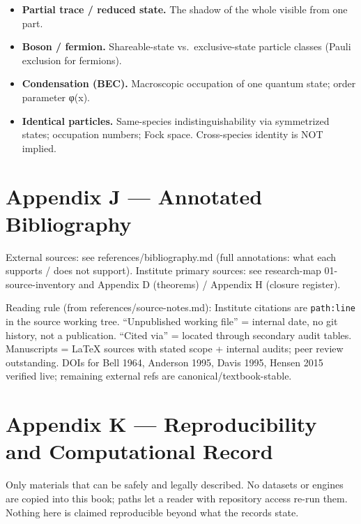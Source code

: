 \documentclass[
  11pt,
]{book}
\begin{document}
\begin{itemize}
  Bell violations; no-signaling respected.
\item
  \textbf{Partial trace / reduced state.} The shadow of the whole
  visible from one part.
\item
  \textbf{Boson / fermion.} Shareable-state vs.~exclusive-state particle
  classes (Pauli exclusion for fermions).
\item
  \textbf{Condensation (BEC).} Macroscopic occupation of one quantum
  state; order parameter φ(x).
\item
  \textbf{Identical particles.} Same-species indistinguishability via
  symmetrized states; occupation numbers; Fock space. Cross-species
  identity is NOT implied.
\end{itemize}

\newpage

\chapter{Appendix J --- Annotated
Bibliography}\label{appendix-j-annotated-bibliography}

External sources: see references/bibliography.md (full annotations: what
each supports / does not support). Institute primary sources: see
research-map 01-source-inventory and Appendix D (theorems) / Appendix H
(closure register).

Reading rule (from references/source-notes.md): Institute citations are
\texttt{path:line} in the source working tree. ``Unpublished working
file'' = internal date, no git history, not a publication. ``Cited via''
= located through secondary audit tables. Manuscripts = LaTeX sources
with stated scope + internal audits; peer review outstanding. DOIs for
Bell 1964, Anderson 1995, Davis 1995, Hensen 2015 verified live;
remaining external refs are canonical/textbook-stable.

\newpage

\chapter{Appendix K --- Reproducibility and Computational
Record}\label{appendix-k-reproducibility-and-computational-record}

Only materials that can be safely and legally described. No datasets or
engines are copied into this book; paths let a reader with repository
access re-run them. Nothing here is claimed reproducible beyond what the
records state.
\end{document}
